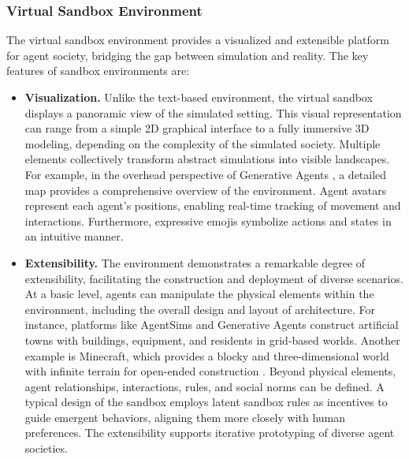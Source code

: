 \subsubsection{Virtual Sandbox Environment}\label{sec:virtual sandbox environment}
The virtual sandbox environment provides a visualized and extensible platform for agent society, bridging the gap between simulation and reality. The key features of sandbox environments are:
\begin{itemize}[leftmargin=*]
    \item \textbf{Visualization.} Unlike the text-based environment, the virtual sandbox displays a panoramic view of the simulated setting. This visual representation can range from a simple 2D graphical interface to a fully immersive 3D modeling, depending on the complexity of the simulated society. Multiple elements collectively transform abstract simulations into visible landscapes. For example, in the overhead perspective of Generative Agents \cite{DBLP:journals/corr/abs-2304-03442}, a detailed map provides a comprehensive overview of the environment. Agent avatars represent each agent's positions, enabling real-time tracking of movement and interactions. Furthermore, expressive emojis symbolize actions and states in an intuitive manner. 
    \item \textbf{Extensibility.} The environment demonstrates a remarkable degree of extensibility, facilitating the construction and deployment of diverse scenarios. At a basic level, agents can manipulate the physical elements within the environment, including the overall design and layout of architecture. For instance, platforms like AgentSims \cite{DBLP:journals/corr/abs-2308-04026} and Generative Agents \cite{DBLP:journals/corr/abs-2304-03442} construct artificial towns with buildings, equipment, and residents in grid-based worlds. Another example is Minecraft, which provides a blocky and three-dimensional world with infinite terrain for open-ended construction \cite{DBLP:journals/corr/abs-2305-16291,DBLP:conf/nips/FanWJMYZTHZA22,  DBLP:journals/corr/abs-2303-16563}. Beyond physical elements, agent relationships, interactions, rules, and social norms can be defined. A typical design of the sandbox \cite{DBLP:journals/corr/abs-2305-16960} employs latent sandbox rules as incentives to guide emergent behaviors, aligning them more closely with human preferences. The extensibility supports iterative prototyping of diverse agent societies.
\end{itemize}
    
